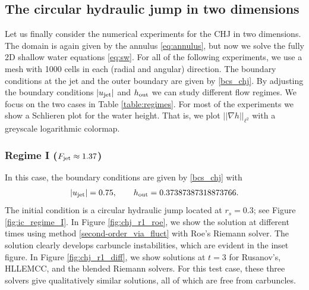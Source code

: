 \documentclass[preprint, 11pt]{article}
\newcommand{\out}{\textup{out}}
\newcommand{\jet}{{\textup{jet}}}
\newcommand{\bfu}{{u}}
\newcommand{\Fr}{{\rm Fr}}
\begin{document}
\subsection{The circular hydraulic jump in two dimensions}\label{sec:2D_chj}
Let us finally consider the numerical experiments for the CHJ in two dimensions.
The domain is again given by the annulus \eqref{eq:annulus}, but now we solve
the fully 2D shallow water equations \eqref{eq:sw}.  For all of the following
experiments, we use a mesh with 1000 cells in each (radial and angular) direction.
The boundary conditions at the jet and the outer boundary are given by \eqref{bcs_chj}.
By adjusting the boundary conditions $|\bfu_\jet|$ and $h_\out$ we can study different flow regimes.
We focus on the two cases in Table \ref{table:regimes}.
%
%
For most of the experiments we show a Schlieren plot for the water height.
That is, we plot $||\nabla h||_{\ell^2}$ with a greyscale logarithmic colormap.

\subsubsection{Regime I ($F_\jet\approx1.37$)}\label{sec:regime_i}
In this case, the boundary conditions are given by \eqref{bcs_chj} with
\begin{align}\label{bcs_chj_r1}
  |\bfu_\jet|=0.75, \qquad h_\out=0.37387387318873766. 
\end{align}
The initial condition is a circular hydraulic jump located at $r_s=0.3$; see Figure \ref{fig:ic_regime_I}. 
In Figure \ref{fig:chj_r1_roe}, we show the solution at different times using
method \eqref{second-order_via_fluct} with Roe's Riemann solver.
The solution clearly develops carbuncle instabilities, which are evident in the inset figure.
In Figure \ref{fig:chj_r1_diff}, we show solutions at $t=3$ for
Rusanov's, HLLEMCC, and the blended Riemann solvers.
For this test case, these three solvers give qualitatively similar solutions,
all of which are free from carbuncles.
\end{document}
